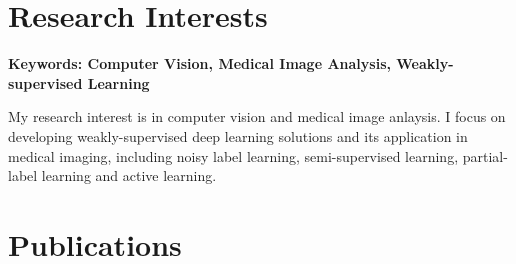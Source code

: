 \documentclass[letterpaper,11pt]{article}
\newcommand{\resumeSubHeadingListStart}{\begin{itemize}[leftmargin=0.15in, label={}]}
\newcommand{\resumeSubHeadingListEnd}{\end{itemize}}
\begin{document}
\section{Research Interests}
  \vspace{2pt}
  \resumeSubHeadingListStart
    \small{\item{
        \textbf{Keywords: Computer Vision, Medical Image Analysis, Weakly-supervised Learning} \\ \vspace{3pt}
        
    }}
    My research interest is in computer vision and medical image anlaysis. I focus on developing weakly-supervised deep learning solutions and its application in medical imaging, including noisy label learning, semi-supervised learning, partial-label learning and active learning.
  \resumeSubHeadingListEnd




\section{Publications}

  \vspace{3pt}
\end{document}
